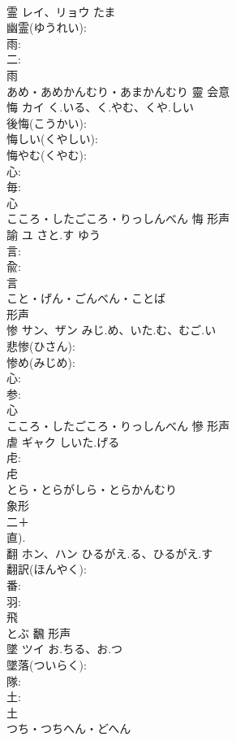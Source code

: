 \documentclass[8pt]{extreport}
\begin{document}
\begin{CJK}{UTF8}{min}
\\	霊	レイ、リョウ	たま		
\\	幽霊(ゆうれい): 
\\	雨: 
\\	二: 
\\	雨	
\\	あめ・あめかんむり・あまかんむり	靈	会意 
\\	悔	カイ	く.いる、く.やむ、くや.しい		
\\	後悔(こうかい): 
\\	悔しい(くやしい): 
\\	悔やむ(くやむ): 
\\	心: 
\\	毎: 
\\	心	
\\	こころ・したごころ・りっしんべん	悔	形声 
\\	諭	ユ	さと.す	ゆう	
\\	言: 
\\	兪: 
\\	言	
\\	こと・げん・ごんべん・ことば	
\\	形声 
\\	惨	サン、ザン	みじ.め、いた.む、むご.い		
\\	悲惨(ひさん): 
\\	惨め(みじめ): 
\\	心: 
\\	参: 
\\	心	
\\	こころ・したごころ・りっしんべん	慘	形声 
\\	虐	ギャク	しいた.げる		
\\	虍: 
\\	虍	
\\	とら・とらがしら・とらかんむり	
\\	象形 
\\	二＋
\\	直).
\\	翻	ホン、ハン	ひるがえ.る、ひるがえ.す		
\\	翻訳(ほんやく): 
\\	番: 
\\	羽: 
\\	飛	
\\	とぶ	飜	形声 
\\	墜	ツイ	お.ちる、お.つ		
\\	墜落(ついらく): 
\\	隊: 
\\	土: 
\\	土	
\\	つち・つちへん・どへん	

\end{CJK}
\end{document}
